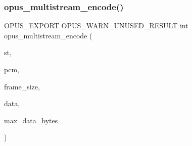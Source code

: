 \subsubsection{\texorpdfstring{opus\_multistream\_encode()}{opus\_multistream\_encode()}}
{\footnotesize\ttfamily O\+P\+U\+S\+\_\+\+E\+X\+P\+O\+RT O\+P\+U\+S\+\_\+\+W\+A\+R\+N\+\_\+\+U\+N\+U\+S\+E\+D\+\_\+\+R\+E\+S\+U\+LT int opus\+\_\+multistream\+\_\+encode (\begin{DoxyParamCaption}\item[{\mbox{\hyperlink{group__opus__multistream_gae5826674d142fc873ebc1d781c507dd7}{Opus\+M\+S\+Encoder}} $\ast$}]{st,  }\item[{const \mbox{\hyperlink{opus__types_8h_acc9ed7cf60479eb81f9648c6ec27dc26}{opus\+\_\+int16}} $\ast$}]{pcm,  }\item[{int}]{frame\+\_\+size,  }\item[{unsigned char $\ast$}]{data,  }\item[{\mbox{\hyperlink{opus__types_8h_aa4d309d6f80b99dbabebc8f98879ab9a}{opus\+\_\+int32}}}]{max\+\_\+data\+\_\+bytes }\end{DoxyParamCaption})}

